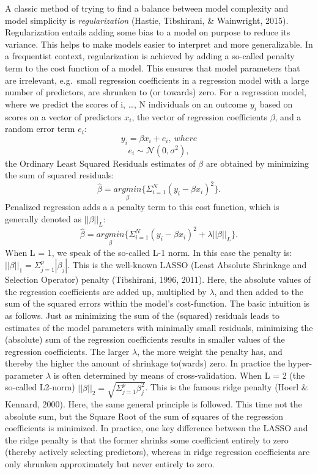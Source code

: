 \documentclass[
  man, donotrepeattitle,floatsintext]{apa6}
\begin{document}
A classic method of trying to find a balance between model complexity and model simplicity is \emph{regularization} (Hastie, Tibshirani, \& Wainwright, 2015). Regularization entails adding some bias to a model on purpose to reduce its variance. This helps to make models easier to interpret and more generalizable. In a frequentist context, regularization is achieved by adding a so-called penalty term to the cost function of a model. This ensures that model parameters that are irrelevant, e.g.~small regression coefficients in a regression model with a large number of predictors, are shrunken to (or towards) zero. For a regression model, where we predict the scores of i, \ldots, N individuals on an outcome \(y_i\) based on scores on a vector of predictors \(x_i\), the vector of regression coefficients \(\beta\), and a random error term \(e_i\):
\[y_i = \beta x_i + e_i, \ where \]
\[e_i \sim \mathcal{N}(0, \sigma^2), \]
the Ordinary Least Squared Residuals estimates of \(\beta\) are obtained by minimizing the sum of squared residuals:
\[ \hat{\beta} = \underset{\beta}{argmin} \{ \Sigma_{i=1}^N(y_i - \beta x_{i} )^2 \}.\] Penalized regression adds a a penalty term to this cost function, which is generally denoted as \(||\beta||_L\):
\[ \hat{\beta} = \underset{\beta}{argmin} \{ \Sigma_{i=1}^N(y_i - \beta x_{i} )^2 + \lambda ||\beta||_{L} \}.\]
When L = 1, we speak of the so-called L-1 norm. In this case the penalty is: \(||\beta||_1 = \Sigma_{j=1}^p |\beta_j|\). This is the well-known LASSO (Least Absolute Shrinkage and Selection Operator) penalty (Tibshirani, 1996, 2011). Here, the absolute values of the regression coefficients are added up, multiplied by \(\lambda\), and then added to the sum of the squared errors within the model's cost-function. The basic intuition is as follows. Just as minimizing the sum of the (squared) residuals leads to estimates of the model parameters with minimally small residuals, minimizing the (absolute) sum of the regression coefficients results in smaller values of the regression coefficients. The larger \(\lambda\), the more weight the penalty has, and thereby the higher the amount of shrinkage to(wards) zero. In practice the hyper-parameter \(\lambda\) is often determined by means of cross-validation. When L = 2 (the so-called L2-norm) \(||\beta||_2 = \sqrt{\Sigma_{j=1}^p \beta_j^2}\). This is the famous ridge penalty (Hoerl \& Kennard, 2000). Here, the same general principle is followed. This time not the absolute sum, but the Square Root of the sum of squares of the regression coefficients is minimized. In practice, one key difference between the LASSO and the ridge penalty is that the former shrinks some coefficient entirely to zero (thereby actively selecting predictors), whereas in ridge regression coefficients are only shrunken approximately but never entirely to zero.
\end{document}
